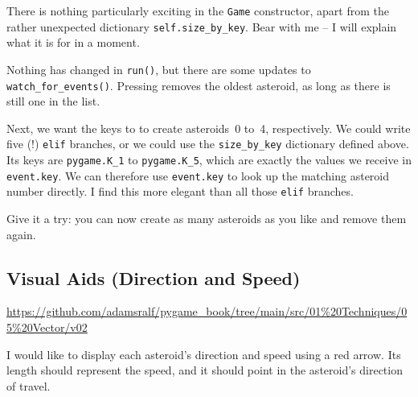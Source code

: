 
There is nothing particularly exciting in the \texttt{Game} constructor, apart from the rather unexpected dictionary \texttt{self.size\_by\_key}. Bear with me -- I will explain what it is for in a moment.


Nothing has changed in \texttt{run()}, but there are some updates to \texttt{watch\_for\_events()}. Pressing  removes the oldest asteroid, as long as there is still one in the list.

Next, we want the keys  to  to create asteroids~0 to~4, respectively. We could write five (!) \texttt{elif} branches, or we could use the \texttt{size\_by\_key} dictionary defined above. Its keys are \texttt{pygame.K\_1} to \texttt{pygame.K\_5}, which are exactly the values we receive in \texttt{event.key}. We can therefore use \texttt{event.key} to look up the matching asteroid number directly. I find this more elegant than all those \texttt{elif} branches.

Give it a try: you can now create as many asteroids as you like and remove them again.


\subsection{Visual Aids (Direction and Speed)}\label{secVectorHelplines}
\begin{diskbox}
	\url{https://github.com/adamsralf/pygame_book/tree/main/src/01%20Techniques/05%20Vector/v02}
\end{diskbox}

	I would like to display each asteroid's direction and speed using a red arrow. Its length should represent the speed, and it should point in the asteroid's direction of travel. 
\er

